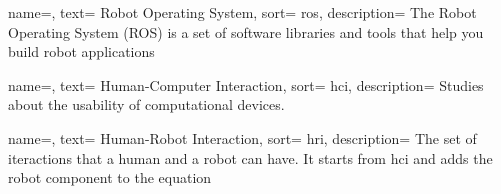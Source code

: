 {
  name=,
  text= Robot Operating System,
  sort= ros,
  description= {The Robot Operating System (ROS) is a set of software libraries and tools that help you build robot applications~\cite{site:ros}}
}

{
  name=,
  text= Human-Computer Interaction,
  sort= hci,
  description= {Studies about the usability of computational devices.}
}

{
  name=,
  text= Human-Robot Interaction,
  sort= hri,
  description= {The set of iteractions that a human and a robot can have. It starts from \gls{hci} and adds the robot component to the equation}
}

